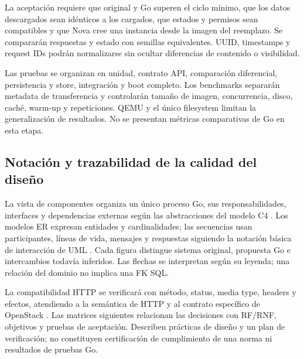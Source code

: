 \documentclass[12pt,a4paper]{article}
\begin{document}
La aceptación requiere que original y Go superen el ciclo mínimo, que los datos descargados sean idénticos a los cargados, que estados y permisos sean compatibles y que Nova cree una instancia desde la imagen del reemplazo. Se compararán respuestas y estado con semillas equivalentes. UUID, timestamps y request IDs podrán normalizarse sin ocultar diferencias de contenido o visibilidad.

Las pruebas se organizan en unidad, contrato API, comparación diferencial, persistencia y store, integración y boot completo. Los benchmarks separarán metadata de transferencia y controlarán tamaño de imagen, concurrencia, disco, caché, warm-up y repeticiones. QEMU y el único filesystem limitan la generalización de resultados. No se presentan métricas comparativas de Go en esta etapa.


\subsection{Notación y trazabilidad de la calidad del diseño}
La vista de componentes organiza un único proceso Go, sus responsabilidades, interfaces y dependencias externas según las abstracciones del modelo C4 \cite{c4}. Los modelos ER expresan entidades y cardinalidades; las secuencias usan participantes, líneas de vida, mensajes y respuestas siguiendo la notación básica de interacción de UML \cite{uml}. Cada figura distingue sistema original, propuesta Go e intercambios todavía inferidos. Las flechas se interpretan según su leyenda; una relación del dominio no implica una FK SQL.

La compatibilidad HTTP se verificará con método, status, media type, headers y efectos, atendiendo a la semántica de HTTP y al contrato específico de OpenStack \cite{http}. Las matrices siguientes relacionan las decisiones con RF/RNF, objetivos y pruebas de aceptación. Describen prácticas de diseño y un plan de verificación; no constituyen certificación de cumplimiento de una norma ni resultados de pruebas Go.
\end{document}
